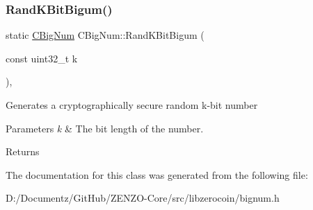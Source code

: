 \subsubsection{\texorpdfstring{RandKBitBigum()}{RandKBitBigum()}}
{\footnotesize\ttfamily static \mbox{\hyperlink{class_c_big_num}{C\+Big\+Num}} C\+Big\+Num\+::\+Rand\+K\+Bit\+Bigum (\begin{DoxyParamCaption}\item[{const uint32\+\_\+t}]{k }\end{DoxyParamCaption})\hspace{0.3cm}{\ttfamily [inline]}, {\ttfamily [static]}}

Generates a cryptographically secure random k-\/bit number 
\begin{DoxyParams}{Parameters}
{\em k} & The bit length of the number. \\
\hline
\end{DoxyParams}
\begin{DoxyReturn}{Returns}

\end{DoxyReturn}


The documentation for this class was generated from the following file\+:\begin{DoxyCompactItemize}
\item 
D\+:/\+Documentz/\+Git\+Hub/\+Z\+E\+N\+Z\+O-\/\+Core/src/libzerocoin/bignum.\+h\end{DoxyCompactItemize}
